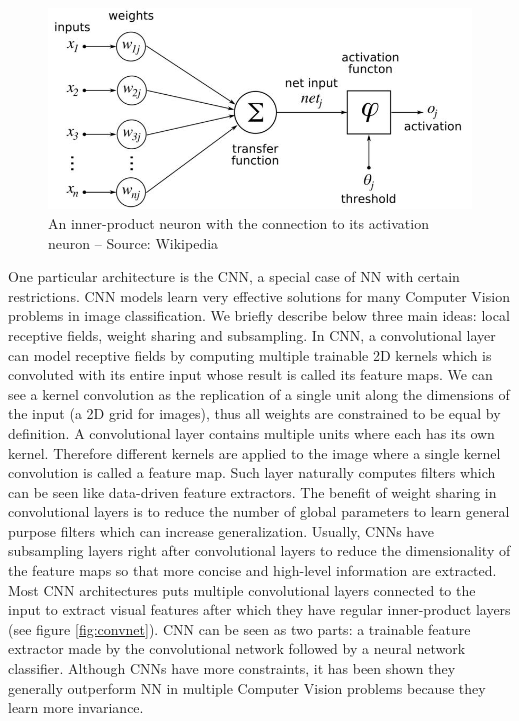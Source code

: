 \documentclass[a4paper,12pt]{report}
\begin{document}
\begin{figure}[h]
    \begin{center}
        \includegraphics{thesis_figures/800px-ArtificialNeuronModel_english.jpg}
    \end{center}
    \caption{An inner-product neuron with the connection to its activation neuron -- Source: Wikipedia}
    \label{fig:artificial_neurons}
\end{figure}

One particular architecture is the CNN, a special case of NN with certain restrictions.
CNN models learn very effective solutions for many Computer Vision problems in image classification.
We briefly describe below three main ideas: local receptive fields, weight sharing and subsampling.
In CNN, a convolutional layer can model receptive fields by computing multiple trainable 2D kernels which is convoluted with its entire input whose result is called its feature maps.
We can see a kernel convolution as the replication of a single unit along the dimensions of the input (a 2D grid for images), thus all weights are constrained to be equal by definition.
A convolutional layer contains multiple units where each has its own kernel.
Therefore different kernels are applied to the image where a single kernel convolution is called a feature map.
Such layer naturally computes filters which can be seen like data-driven feature extractors.
The benefit of weight sharing in convolutional layers is to reduce the number of global parameters to learn general purpose filters which can increase generalization.
Usually, CNNs have subsampling layers right after convolutional layers to reduce the dimensionality of the feature maps so that more concise and high-level information are extracted.
Most CNN architectures puts multiple convolutional layers connected to the input to extract visual features after which they have regular inner-product layers (see figure \ref{fig:convnet}).
CNN can be seen as two parts: a trainable feature extractor made by the convolutional network followed by a neural network classifier.
Although CNNs have more constraints, it has been shown they generally outperform NN in multiple Computer Vision problems because they learn more invariance\cite{simard2003best}\cite{mnist_web}\cite{lawrence1997face}\cite{krizhevsky2012imagenet}.
\end{document}
